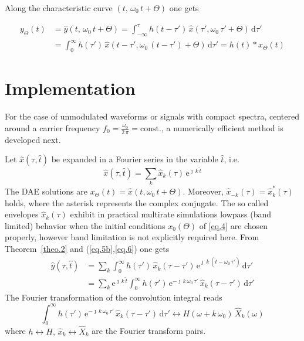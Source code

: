 \documentclass[journal]{IEEEtran}
\newcommand{\beq}{\begin{equation}}
\newcommand{\eeq}{ \end{equation} }
\newcommand{\no}{\nonumber}
\newcommand{\drm}{\ensuremath{\mathrm{d}}}
\newcommand{\htt}{\ensuremath{\hat{t}}}
\begin{document}
Along the characteristic curve $(t,\,\omega_0\,t + \Theta)$ one gets 

\begin{align}
 y_\Theta(t) &= \hat{y}(t,\,\omega_0\,t+\Theta)
 =  \int_{-\infty}^\tau 
 {h}(t-\tau')\,\hat{x}(\tau',\omega_0\,\tau'  + \Theta)\,\drm\tau' \no\\
&= \int_0^{\infty} 
  {h}(\tau')\,\hat{x}(t-\tau',\omega_0\,(t-\tau') + \Theta)\,\drm\tau' 
  = h(t) * x_\Theta(t) \label{60}
\end{align}

\section{Implementation}

For the case of unmodulated waveforms or signals with compact spectra,
centered around a carrier frequency $f_0=\frac{\omega_0}{2\,\pi}=\text{const.}$,  
a numerically efficient method is developed next.
   
Let $\hat{x}(\tau,\htt)$ be 
expanded in a Fourier series in the variable $\htt$, i.e.\
\beq
 \label{eq.6}
 \hat{x}(\tau,\htt) = 
  \sum_{k} \hat{x}_k(\tau)\,\mathrm{e}^{{}\jmath \, k\, \htt} 
\eeq
The DAE solutions are $x_\Theta(t) = \hat{x}(t,\omega_0\,t + \Theta)$.
Moreover, $\hat{x}_{-k}(\tau) = \hat{x}^*_k(\tau)$ holds, where the asterisk
represents the complex conjugate.
The so called envelopes $\hat{x}_k(\tau)$ exhibit in practical multirate
simulations lowpass (band limited) behavior when the initial conditions
$x_0(\Theta)$ of \eqref{eq.4} are chosen properly, however
band limitation is not explicitly required here.
From Theorem~\ref{theo.2} and (\ref{eq.5b},\ref{eq.6}) one gets
\begin{align}
    \hat{y}(\tau,\htt) &= \sum_k \int_0^\infty h(\tau')\,
     \hat{x}_k(\tau-\tau')\, 
     \mathrm{e}^{\jmath \,k\, (\htt - \omega_0 \,\tau')}\,  \drm \tau' \no\\
     &= \sum_k \mathrm{e}^{{}\jmath \,k\, \htt} 
     \int_0^\infty h(\tau')\, \mathrm{e}^{-\jmath \, k\, \omega_0 \,\tau'}\,
     \hat{x}_k(\tau-\tau')\,\drm \tau' \label{8a}
\end{align}
The Fourier transformation of the convolution integral reads
\beq
\int_0^\infty h(\tau')\, \mathrm{e}^{-\jmath \, k\, \omega_0 \,\tau'}\,
     \hat{x}_k(\tau-\tau')\,\drm \tau' \leftrightarrow 
     H(\omega+k\, \omega_0) \, \hat{X}_k(\omega)
     \label{eq.8}
\eeq
where $h \leftrightarrow H,\, \hat{x}_k \leftrightarrow \hat{X}_k$
are the Fourier transform pairs.
\end{document}
